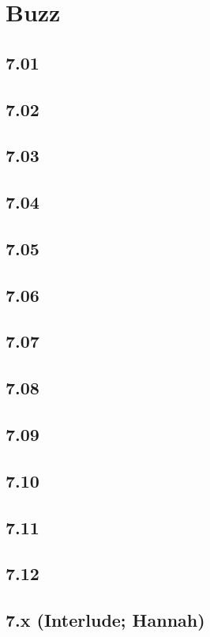 \part{Buzz}
 \chapter{7.01}
 \chapter{7.02}
 \chapter{7.03}
 \chapter{7.04}
 \chapter{7.05}
 \chapter{7.06}
 \chapter{7.07}
 \chapter{7.08}
 \chapter{7.09}
 \chapter{7.10}
 \chapter{7.11}
 \chapter{7.12}
 \chapter{7.x (Interlude; Hannah)}















